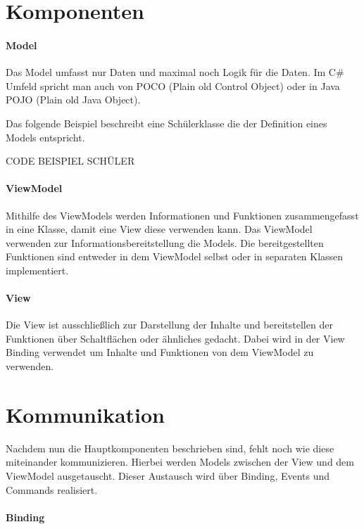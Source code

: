 \documentclass[titlepage=false,12pt]{scrreprt}
\begin{document}
\section{Komponenten}

\paragraph{Model}

Das Model umfasst nur Daten und maximal noch Logik für die Daten. 
Im C\# Umfeld spricht man auch von POCO (Plain old Control Object) 
oder in Java POJO (Plain old Java Object).
	
Das folgende Beispiel beschreibt eine Schülerklasse die der Definition 
eines Models entspricht.

CODE BEISPIEL SCHÜLER

\paragraph{ViewModel}

Mithilfe des ViewModels werden Informationen und Funktionen zusammengefasst
in eine Klasse, damit eine View diese verwenden kann. Das ViewModel verwenden zur 
Informationsbereitstellung die Models. Die bereitgestellten Funktionen sind
entweder in dem ViewModel selbst oder in separaten Klassen implementiert.

\paragraph{View}

Die View ist ausschließlich zur Darstellung der Inhalte und bereitstellen der
Funktionen über Schaltflächen oder ähnliches gedacht. Dabei wird in der View
Binding verwendet um Inhalte und Funktionen von dem ViewModel zu verwenden.

\section{Kommunikation}

Nachdem nun die Hauptkomponenten beschrieben sind, fehlt noch wie diese miteinander 
kommunizieren. Hierbei werden Models zwischen der View und dem ViewModel ausgetauscht.
Dieser Austausch wird über Binding, Events und Commands realisiert.

\paragraph{Binding}
\end{document}

